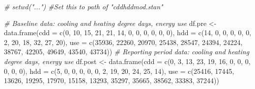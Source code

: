 \documentclass[
]{article}
\newenvironment{Shaded}{\begin{snugshade}}{\end{snugshade}}
\newcommand{\AttributeTok}[1]{\textcolor[rgb]{0.77,0.63,0.00}{#1}}
\newcommand{\CommentTok}[1]{\textcolor[rgb]{0.56,0.35,0.01}{\textit{#1}}}
\newcommand{\DecValTok}[1]{\textcolor[rgb]{0.00,0.00,0.81}{#1}}
\newcommand{\FunctionTok}[1]{\textcolor[rgb]{0.00,0.00,0.00}{#1}}
\newcommand{\NormalTok}[1]{#1}
\newcommand{\OtherTok}[1]{\textcolor[rgb]{0.56,0.35,0.01}{#1}}
\begin{document}
\begin{Shaded}
\begin{Highlighting}[]
\CommentTok{\# setwd("...") \#Set this to path of "cddhddmod.stan"}

\CommentTok{\# Baseline data: cooling and heating degree days, energy use}
\NormalTok{df.pre }\OtherTok{\textless{}{-}} \FunctionTok{data.frame}\NormalTok{(}\AttributeTok{cdd =} \FunctionTok{c}\NormalTok{(}\DecValTok{0}\NormalTok{, }\DecValTok{10}\NormalTok{, }\DecValTok{15}\NormalTok{, }\DecValTok{21}\NormalTok{, }\DecValTok{21}\NormalTok{, }\DecValTok{14}\NormalTok{, }\DecValTok{0}\NormalTok{, }\DecValTok{0}\NormalTok{, }\DecValTok{0}\NormalTok{, }\DecValTok{0}\NormalTok{, }\DecValTok{0}\NormalTok{, }\DecValTok{0}\NormalTok{),}
                     \AttributeTok{hdd =} \FunctionTok{c}\NormalTok{(}\DecValTok{14}\NormalTok{, }\DecValTok{0}\NormalTok{, }\DecValTok{0}\NormalTok{, }\DecValTok{0}\NormalTok{, }\DecValTok{0}\NormalTok{, }\DecValTok{0}\NormalTok{, }\DecValTok{2}\NormalTok{, }\DecValTok{20}\NormalTok{, }\DecValTok{18}\NormalTok{, }\DecValTok{32}\NormalTok{, }\DecValTok{27}\NormalTok{, }\DecValTok{20}\NormalTok{),}
                     \AttributeTok{use =} \FunctionTok{c}\NormalTok{(}\DecValTok{35936}\NormalTok{, }\DecValTok{22260}\NormalTok{, }\DecValTok{20970}\NormalTok{, }\DecValTok{25438}\NormalTok{, }\DecValTok{28547}\NormalTok{, }\DecValTok{24394}\NormalTok{,}
                             \DecValTok{24224}\NormalTok{, }\DecValTok{38767}\NormalTok{, }\DecValTok{42205}\NormalTok{, }\DecValTok{49649}\NormalTok{, }\DecValTok{43540}\NormalTok{, }\DecValTok{43734}\NormalTok{))}
\CommentTok{\# Reporting period data: cooling and heating degree days, energy use}
\NormalTok{df.post }\OtherTok{\textless{}{-}} \FunctionTok{data.frame}\NormalTok{(}\AttributeTok{cdd =} \FunctionTok{c}\NormalTok{(}\DecValTok{0}\NormalTok{, }\DecValTok{3}\NormalTok{, }\DecValTok{13}\NormalTok{, }\DecValTok{23}\NormalTok{, }\DecValTok{19}\NormalTok{, }\DecValTok{16}\NormalTok{, }\DecValTok{0}\NormalTok{, }\DecValTok{0}\NormalTok{, }\DecValTok{0}\NormalTok{, }\DecValTok{0}\NormalTok{, }\DecValTok{0}\NormalTok{, }\DecValTok{0}\NormalTok{),}
                      \AttributeTok{hdd =} \FunctionTok{c}\NormalTok{(}\DecValTok{5}\NormalTok{, }\DecValTok{0}\NormalTok{, }\DecValTok{0}\NormalTok{, }\DecValTok{0}\NormalTok{, }\DecValTok{0}\NormalTok{, }\DecValTok{0}\NormalTok{, }\DecValTok{2}\NormalTok{, }\DecValTok{19}\NormalTok{, }\DecValTok{20}\NormalTok{, }\DecValTok{24}\NormalTok{, }\DecValTok{25}\NormalTok{, }\DecValTok{14}\NormalTok{),}
                      \AttributeTok{use =} \FunctionTok{c}\NormalTok{(}\DecValTok{25416}\NormalTok{, }\DecValTok{17445}\NormalTok{, }\DecValTok{13626}\NormalTok{, }\DecValTok{19295}\NormalTok{, }\DecValTok{17970}\NormalTok{, }\DecValTok{15158}\NormalTok{,}
                              \DecValTok{13293}\NormalTok{, }\DecValTok{35297}\NormalTok{, }\DecValTok{35665}\NormalTok{, }\DecValTok{38562}\NormalTok{, }\DecValTok{33383}\NormalTok{, }\DecValTok{37244}\NormalTok{))}
\end{Highlighting}
\end{Shaded}
\end{document}
